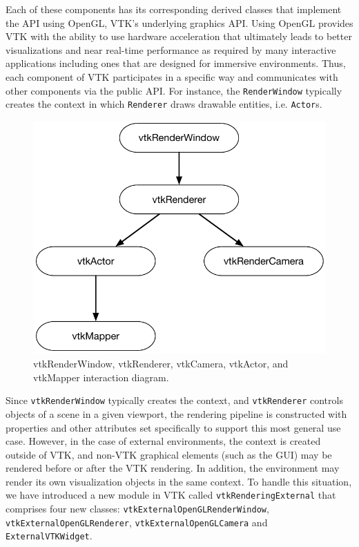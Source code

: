 Each of these components has its corresponding derived classes that implement the API using OpenGL, VTK's underlying graphics API.
Using OpenGL provides VTK with the ability to use hardware acceleration that ultimately leads to better visualizations and near real-time performance as required by many interactive applications including ones that are designed for immersive environments.
Thus, each component of VTK participates in a specific way and communicates with other components via the public API.
For instance, the \texttt{RenderWindow} typically creates the context in which
\texttt{Renderer} draws drawable entities, i.e. \texttt{Actor}s.

\begin{figure}[h!]
  \centering
  \includegraphics[width=\linewidth]{images/vtkRenderPipeline.pdf}
  \caption{vtkRenderWindow, vtkRenderer, vtkCamera, vtkActor, and vtkMapper interaction diagram.}
  \label{fig:vtkRenderPipeline}
\end{figure}

Since \texttt{vtkRenderWindow} typically creates the context, and \texttt{vtkRenderer} controls objects of a scene in a given viewport, the rendering pipeline is constructed with properties and other attributes set specifically to support this most general use case.
However, in the case of external environments, the context is created outside of VTK, and non-VTK graphical elements (such as the GUI) may be rendered before or after the VTK rendering.
In addition, the environment may render its own visualization objects in the same context.
To handle this situation, we have introduced a new module in VTK called \texttt{vtkRenderingExternal} that comprises four new classes: \texttt{vtkExternalOpenGLRenderWindow}, \texttt{vtkExternalOpenGLRenderer}, \texttt{vtkExternalOpenGLCamera} and \texttt{ExternalVTKWidget}. 

